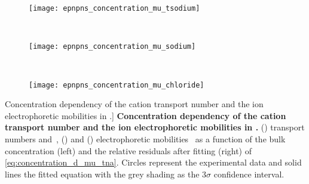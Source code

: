 %
\begin{figure*}[p]
  \centering

  \begin{subfigure}[t]{11cm}
    \centering
    \caption{}\vspace{-1mm}\label{fig:epnpns_concentration_mu_tsodium}
    \texttt{[image: epnpns\_concentration\_mu\_tsodium]}
  \end{subfigure}
  \\
  \begin{subfigure}[t]{11cm}
    \centering
    \caption{}\vspace{-1mm}\label{fig:epnpns_concentration_mu_sodium}
    \texttt{[image: epnpns\_concentration\_mu\_sodium]}
  \end{subfigure}
  \\
  \begin{subfigure}[t]{11cm}
    \centering
    \caption{}\vspace{-1mm}\label{fig:epnpns_concentration_mu_chloride}
    \texttt{[image: epnpns\_concentration\_mu\_chloride]}
  \end{subfigure}

  \caption%
    [Concentration dependency of the cation transport number and the ion electrophoretic mobilities in
    .]
    {%
      \textbf{Concentration dependency of the cation transport number and the ion electrophoretic mobilities
      in .}
      ()
      \Na{} transport numbers
      and~\cite{Esteso-1976,Haynes-2017,DellaMonica-1979,Panopoulos-1986,Schonert-2013},
      ()
      \Na{} and
      ()
      \Cl{} electrophoretic mobilities~\cite{Bianchi-1989,Currie-1960,Goldsack-1976,DellaMonica-1979} as a
      function of the bulk  concentration (left) and the relative residuals after fitting (right) of
      \cref{eq:concentration_d_mu_tna}. Circles represent the experimental data and solid lines the fitted
      equation with the grey shading as the $3\sigma$ confidence interval.
  }\label{fig:epnpns_concentration_mu}
\end{figure*}
%


